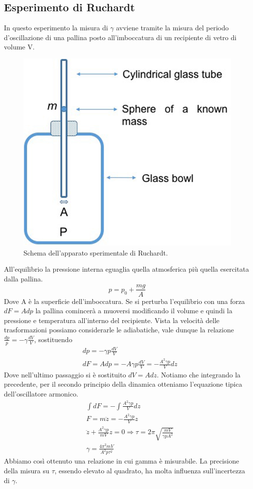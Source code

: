 \documentclass[10pt,a4paper]{article}
\begin{document}
\subsection{Esperimento di Ruchardt}
In questo esperimento la misura di \(\gamma\) avviene tramite la misura del periodo d'oscillazione di una pallina posto all'imboccatura di un recipiente di vetro di volume V.
\begin{figure}[h!]
	\centering
	\includegraphics[width=0.4\linewidth]{../images/ruchardt}
	\caption{Schema dell'apparato sperimentale di Ruchardt.}
	\label{fig:ruchardt}
\end{figure}
\FloatBarrier
 All'equilibrio la pressione interna eguaglia quella atmosferica più quella esercitata dalla pallina. \[p = p_0 + \frac{m g}{A}\] Dove A è la superficie dell'imboccatura. Se si perturba l'equilibrio con una forza \(dF = A dp\) la pallina comincerà a muoversi modificando il volume e quindi la pressione e temperatura all'interno del recipiente. Vista la velocità delle trasformazioni possiamo considerarle le adiabatiche, vale dunque la relazione \(\frac{dp}{p}=-\gamma\frac{dV}{V}\), sostituendo
 \begin{align*}
 	&dp = -\gamma p \frac{dV}{V}\\
 	&dF = A dp = - A \gamma p \frac{dV}{V} = - \frac{A^2 \gamma p}{V}dz
 \end{align*} 
 Dove nell'ultimo passaggio si è sostituito $dV = A dz$. Notiamo che integrando la precedente, per il secondo principio della dinamica otteniamo l'equazione tipica dell'oscillatore armonico. 
 \begin{align*}
 	&\int dF = -\int  \frac{A^2 \gamma p}{V}dz\\
 	&F = m \ddot{z}= - \frac{A^2 \gamma p}{V} z\\
 	&\ddot{z} + \frac{A^2 \gamma p}{m V} z = 0 \Rightarrow \tau = 2\pi \sqrt{\frac{mV}{\gamma p A^2}}\\
 	&\gamma = \frac{4 \pi^2 m V}{A^2 p \tau^2}
 \end{align*}
Abbiamo così ottenuto una relazione in cui gamma è misurabile. La precisione della misura su $\tau$, essendo elevato al quadrato, ha molta influenza sull'incertezza di $\gamma$. 
\end{document}
